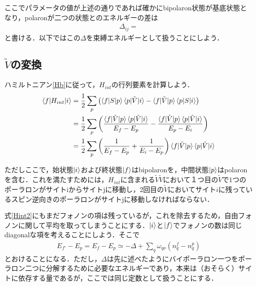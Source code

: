 \documentclass[a4j]{jarticle}
\begin{document}
ここでパラメータの値が上述の通りであれば確かにbipolaron状態が基底状態となり，polaronが二つの状態とのエネルギーの差は
\begin{align*}
 \Delta_{ij}=
\end{align*}
と書ける．以下ではこの$\Delta$を束縛エネルギーとして扱うことにしよう．


\subsection{$\tilde{V}$の変換}
ハミルトニアン\eqref{Hb}に従って，$H_{int}$の行列要素を計算しよう．
\begin{align}
 \braket{f|H_{int}|i}&=\frac{1}{2}\sum_{p}\left(\braket{f|S|p}\braket{p|\tilde{V}|i}-\braket{f|\tilde{V}|p}\braket{p|S|i}\right) \\
&=\frac{1}{2}\sum_{p}\left(\frac{\braket{f|\tilde{V}|p}\braket{p|\tilde{V}|i}}{E_f-E_p}-\frac{\braket{f|\tilde{V}|p}\braket{p|\tilde{V}|i}}{E_p-E_i}\right) \\
&=\frac{1}{2}\sum_{p}\left(\frac{1}{E_f-E_p}+\frac{1}{E_i-E_p}\right)\braket{f|\tilde{V}|p}\braket{p|\tilde{V}|i}\label{Hint2}\\
\end{align}

ただしここで，始状態$\ket{i}$および終状態$\ket{f}$はbipolaronを，中間状態$\ket{p}$はpolaronを含む．これを満たすためには，$H_{int}$に含まれる$\tilde{V}\tilde{V}$において１つ目の$\tilde{V}$で$1$つのポーラロンがサイトiからサイトjに移動し，2回目の$\tilde{V}$においてサイト$i$に残っているスピン逆向きのポーラロンがサイトjに移動しなければならない．

式\eqref{Hint2}にもまだフォノンの項は残っているが，これを除去するため，自由フォノンに関して平均を取ってしまうことにする．$\ket{i}$と$\ket{f}$でフォノンの数は同じdiagonalな項を考えることにしよう．そこで
\begin{align}
 E_{f'}-E_p=E_f-E_p\simeq -\Delta +\sum_{q}\omega_{q\nu}\left(n^f_q-n^p_q\right)
\end{align}
とおけることになる．ただし，$\Delta$は先に述べたようにバイポーラロン一つをポーラロン二つに分解するために必要なエネルギーであり，本来は（おそらく）サイトに依存する量であるが，ここでは同じ定数として扱うことにする．
\end{document}
